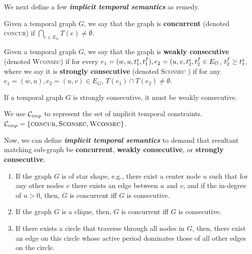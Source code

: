 We next define a few {\bf {\em implicit temporal semantics}} as remedy. 

\begin{defn}
  \label{def:concur}
  Given a temporal graph $G$, we say that the graph is {\bf concurrent} (denoted \textsc{concur}) if
  $\displaystyle\bigcap_{e \in E_G}T(e) \neq \emptyset$.
\end{defn}

\begin{defn}
  \label{def:consec}  
  Given a temporal graph $G$, we say that the graph is \textbf{weakly
    consecutive} (denoted \textsc{Wconsec}) if for every $e_1 = (w,u, t^s_1 , t^f_1), 
    e_2 = (u,v, t^s_2, t^f_2 \in   E_G$, $t^f_2 \geq t^s_1$, where we say it is 
    {\bf strongly consecutive} (denoted \textsc{Sconsec} ) if for
  any $e_1 = (w,u), e_2=(u,v) \in E_G$, $T(e_1) \cap T(e_2) \neq \emptyset$.
\end{defn}

\begin{lemma}
If a temporal graph $G$ is strongly consecutive, it must be weakly consecutive.
\end{lemma}

We use $\mathcal{C}_{imp}$ to represent the set of implicit temporal constraints. $\mathcal{C}_{imp} 
=   \{\textsc{concur}, \textsc{Sconsec}, \textsc{Wconsec}\}$. 

Now, we can define {\bf {\em implicit temporal semantics}} to demand that
resultant matching sub-graph be \textbf{concurrent}, \textbf{weakly
  consecutive}, or \textbf{strongly consecutive}.

\SmallSpace
{}
 \begin{enumerate}
	\item If the graph $G$ is of star shape, e.g., there exist a center node
          $u$ such that for any other nodes $v$ there exists an edge between $u$
          and $v$, and if the in-degree of $u>0$, then, $G$ is concurrent iff $G$ is consecutive.
	\item If the graph $G$ is a clique, then, $G$ is concurrent iff $G$ is
          consecutive.
	\item If there exists a circle that traverse through all nodes in $G$,
          then, there exist an edge on this circle whose active period dominates
          those of all other edges on the circle.
	
\end{enumerate}

